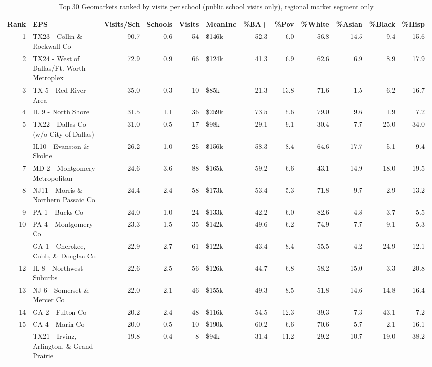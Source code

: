 \begin{table}
\centering
\caption{Top 30 Geomarkets ranked by visits per school (public school visits only), regional market segment only}
\centering
\begin{tabular}[t]{rlrrrlrrrrrr}
\toprule
Rank & EPS & Visits/Sch & Schools & Visits & MeanInc & \%BA+ & \%Pov & \%White & \%Asian & \%Black & \%Hisp\\
\midrule
1 & TX23 - Collin \& Rockwall Co & 90.7 & 0.6 & 54 & \$146k & 52.3 & 6.0 & 56.8 & 14.5 & 9.4 & 15.6\\
2 & TX24 - West of Dallas/Ft. Worth Metroplex & 72.9 & 0.9 & 66 & \$124k & 41.3 & 6.9 & 62.6 & 6.9 & 8.9 & 17.9\\
3 & TX 5 - Red River Area & 35.0 & 0.3 & 10 & \$85k & 21.3 & 13.8 & 71.6 & 1.5 & 6.2 & 16.7\\
4 & IL 9 - North Shore & 31.5 & 1.1 & 36 & \$259k & 73.5 & 5.6 & 79.0 & 9.6 & 1.9 & 7.2\\
5 & TX22 - Dallas Co (w/o City of Dallas) & 31.0 & 0.5 & 17 & \$98k & 29.1 & 9.1 & 30.4 & 7.7 & 25.0 & 34.0\\
\addlinespace
6 & IL10 - Evanston \& Skokie & 26.2 & 1.0 & 25 & \$156k & 58.3 & 8.4 & 64.6 & 17.7 & 5.1 & 9.4\\
7 & MD 2 - Montgomery Metropolitan & 24.6 & 3.6 & 88 & \$165k & 59.2 & 6.6 & 43.1 & 14.9 & 18.0 & 19.5\\
8 & NJ11 - Morris \& Northern Passaic Co & 24.4 & 2.4 & 58 & \$173k & 53.4 & 5.3 & 71.8 & 9.7 & 2.9 & 13.2\\
9 & PA 1 - Bucks Co & 24.0 & 1.0 & 24 & \$133k & 42.2 & 6.0 & 82.6 & 4.8 & 3.7 & 5.5\\
10 & PA 4 - Montgomery Co & 23.3 & 1.5 & 35 & \$142k & 49.6 & 6.2 & 74.9 & 7.7 & 9.1 & 5.3\\
\addlinespace
11 & GA 1 - Cherokee, Cobb, \& Douglas Co & 22.9 & 2.7 & 61 & \$122k & 43.4 & 8.4 & 55.5 & 4.2 & 24.9 & 12.1\\
12 & IL 8 - Northwest Suburbs & 22.6 & 2.5 & 56 & \$126k & 44.7 & 6.8 & 58.2 & 15.0 & 3.3 & 20.8\\
13 & NJ 6 - Somerset \& Mercer Co & 22.0 & 2.1 & 46 & \$155k & 49.3 & 8.5 & 51.8 & 14.6 & 14.8 & 16.4\\
14 & GA 2 - Fulton Co & 20.2 & 2.4 & 48 & \$116k & 54.5 & 12.3 & 39.3 & 7.3 & 43.1 & 7.2\\
15 & CA 4 - Marin Co & 20.0 & 0.5 & 10 & \$190k & 60.2 & 6.6 & 70.6 & 5.7 & 2.1 & 16.1\\
\addlinespace
16 & TX21 - Irving, Arlington, \& Grand Prairie & 19.8 & 0.4 & 8 & \$94k & 31.4 & 11.2 & 29.2 & 10.7 & 19.0 & 38.2\\

\end{tabular}
\end{table}
